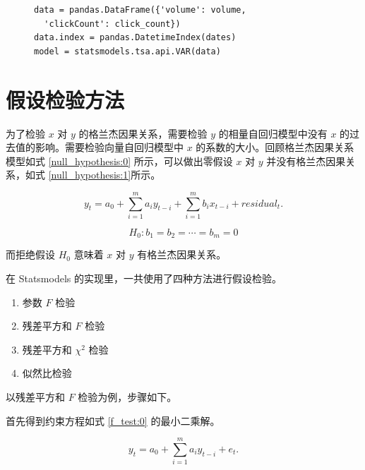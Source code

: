 \begin{figure}
  \begin{minipage}{\textwidth}
    \begin{lstlisting}[caption=落后期选择逻辑, label=auto_regression:2]
data = pandas.DataFrame({'volume': volume,
  'clickCount': click_count})
data.index = pandas.DatetimeIndex(dates)
model = statsmodels.tsa.api.VAR(data)
    \end{lstlisting}
  \end{minipage}
\end{figure}

\section{假设检验方法}

为了检验 $x$ 对 $y$ 的格兰杰因果关系，需要检验 $y$ 的相量自回归模型中没有 $x$ 的过去值的影响。需要检验向量自回归模型中 $x$ 的系数的大小。回顾格兰杰因果关系模型如式 \ref{null_hypothesis:0} 所示，可以做出零假设 $x$ 对 $y$ 并没有格兰杰因果关系，如式 \ref{null_hypothesis:1}所示。

\begin{equation}
  \label{null_hypothesis:0}
  y_{t}=a_{0}+\sum_{i=1}^{m}a_{i}y_{t-i}+\sum_{i=1}^{m}b_{i}x_{t-i}+residual_{t}.
\end{equation}

\begin{equation}
  \label{null_hypothesis:1}
  H_{0}:b_{1}=b_{2}=\cdots =b_{m}=0
\end{equation}

而拒绝假设 $H_{0}$ 意味着 $x$ 对 $y$ 有格兰杰因果关系。

在 Statsmodels 的实现里，一共使用了四种方法进行假设检验。

\begin{enumerate}
  \item 参数 $F$ 检验
  \item 残差平方和 $F$ 检验
  \item 残差平方和 $\chi^{2}$ 检验
  \item 似然比检验
\end{enumerate}

以残差平方和 $F$ 检验为例，步骤如下。

首先得到约束方程如式 \ref{f_test:0} 的最小二乘解。

\begin{equation}
  \label{f_test:0}
  y_t=a_{0}+\sum_{i=1}^{m}a_{i}y_{t-i}+e_{t}.
\end{equation}

